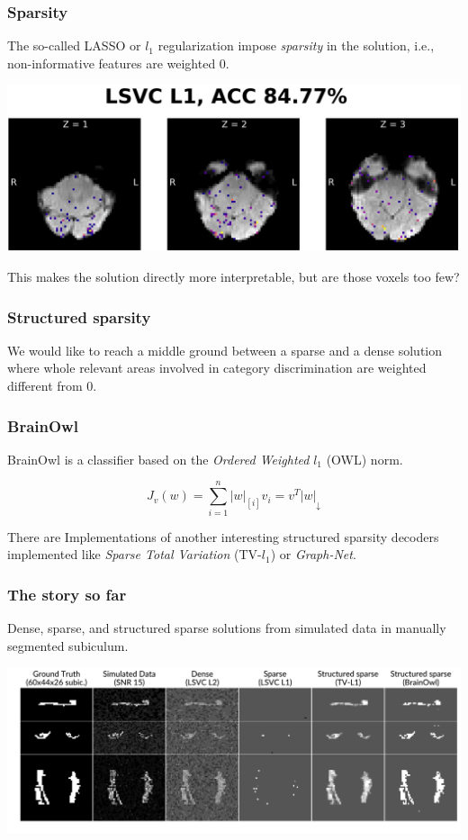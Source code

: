 \documentclass[11pt]{beamer}
\begin{document}
\begin{frame}
    \frametitle{Sparsity}
    The so-called LASSO or $l_1$ regularization impose \emph{sparsity} in the
    solution, i.e., non-informative features are weighted 0. 

    \begin{center}
        \includegraphics[scale=0.7]{figures/lsvc_l1-axial.png}
    \end{center}

    This makes the solution directly more interpretable, but are those voxels
    too few?  

\end{frame}
\begin{frame}
    \frametitle{Structured sparsity}
    We would like to reach a middle ground between a sparse and a dense
    solution where whole relevant areas involved in category discrimination are
    weighted different from 0.


\end{frame}
\begin{frame}
    \frametitle{BrainOwl}
    BrainOwl is a classifier based on the \emph{Ordered Weighted} $l_1$
    (OWL) norm.

    \[J_v(w) = \sum_{i=1}^{n} |w|_{[i]} v_i = v^T |w|_{\downarrow}\]

    There are Implementations of another interesting structured sparsity
    decoders implemented like \emph{Sparse Total Variation}
    (TV-$l_1$) or
    \emph{Graph-Net}.

\end{frame}
\begin{frame}
    \frametitle{The story so far}
    
    Dense, sparse, and structured sparse solutions from simulated data in
    manually segmented subiculum.

    \begin{center}
        \includegraphics[scale=0.35]{figures/template_and_weights_4_clfs.png}
    \end{center}

\end{frame}
\end{document}
